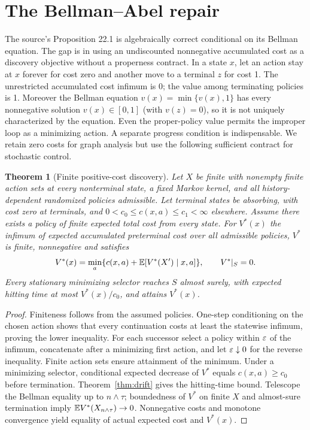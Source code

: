 \documentclass[11pt]{article}
\newtheorem{theorem}{Theorem}[section]\newtheorem{proposition}[theorem]{Proposition}\newtheorem{lemma}[theorem]{Lemma}\newtheorem{corollary}[theorem]{Corollary}
\theoremstyle{definition}\newtheorem{definition}[theorem]{Definition}\newtheorem{example}[theorem]{Example}\newtheorem{conjecture}[theorem]{Conjecture}
\begin{document}
\section{The Bellman--Abel repair}\label{sec:abel}
The source's Proposition 22.1 is algebraically correct conditional on its Bellman equation. The gap is in using an undiscounted nonnegative accumulated cost as a discovery objective without a properness contract. In a state $x$, let an action stay at $x$ forever for cost zero and another move to a terminal $z$ for cost 1. The unrestricted accumulated cost infimum is 0; the value among terminating policies is 1. Moreover the Bellman equation $v(x)=\min\{v(x),1\}$ has every nonnegative solution $v(x)\in[0,1]$ (with $v(z)=0$), so it is not uniquely characterized by the equation. Even the proper-policy value permits the improper loop as a minimizing action. A separate progress condition is indispensable. We retain zero costs for graph analysis but use the following sufficient contract for stochastic control.
\begin{theorem}[Finite positive-cost discovery]\label{thm:ssp}
Let $X$ be finite with nonempty finite action sets at every nonterminal state, a fixed Markov kernel, and all history-dependent randomized policies admissible. Let terminal states be absorbing, with cost zero at terminals, and $0<c_0\le c(x,a)\le c_1<\infty$ elsewhere. Assume there exists a policy of finite expected total cost from every state. For $V^*(x)$ the infimum of expected accumulated preterminal cost over all admissible policies, $V^*$ is finite, nonnegative and satisfies
\[V^*(x)=\min_a\{c(x,a)+\mathbb E[V^*(X')\mid x,a]\},\qquad V^*|_S=0.\]
Every stationary minimizing selector reaches $S$ almost surely, with expected hitting time at most $V^*(x)/c_0$, and attains $V^*(x)$.
\end{theorem}
\begin{proof}
Finiteness follows from the assumed policies. One-step conditioning on the chosen action shows that every continuation costs at least the statewise infimum, proving the lower inequality. For each successor select a policy within $\varepsilon$ of the infimum, concatenate after a minimizing first action, and let $\varepsilon\downarrow0$ for the reverse inequality. Finite action sets ensure attainment of the minimum. Under a minimizing selector, conditional expected decrease of $V^*$ equals $c(x,a)\ge c_0$ before termination. Theorem~\ref{thm:drift} gives the hitting-time bound. Telescope the Bellman equality up to $n\wedge\tau$; boundedness of $V^*$ on finite $X$ and almost-sure termination imply $\mathbb E V^*(X_{n\wedge\tau})\to0$. Nonnegative costs and monotone convergence yield equality of actual expected cost and $V^*(x)$.
\end{proof}
\end{document}
